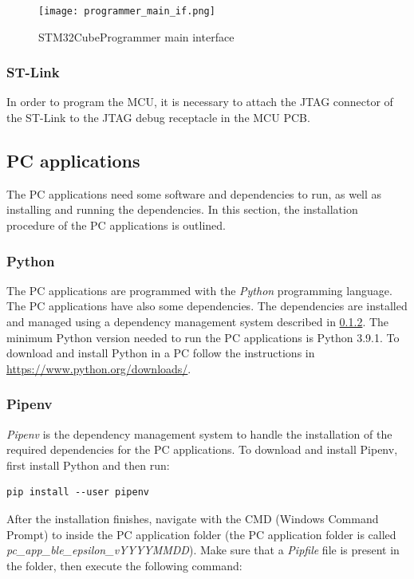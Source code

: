 \begin{figure}[ht]
	\centering
	\texttt{[image: programmer\_main\_if.png]}
	\caption{STM32CubeProgrammer main interface \label{fig:prog_main}}
\end{figure}

\subsubsection{ST-Link}

In order to program the MCU, it is necessary to attach the JTAG connector of the ST-Link to the JTAG debug receptacle in the MCU PCB.

\subsection{PC applications} \label{secdoc:pc_install}

The PC applications need some software and dependencies to run, as well as installing and running the dependencies. In this section, the installation procedure of the PC applications is outlined.

\subsubsection{Python}

The PC applications are programmed with the \textit{Python} programming language. The PC applications have also some dependencies. The dependencies are installed and managed using a dependency management system described in \cref{secdoc:pipenv}. The minimum Python version needed to run the PC applications is Python 3.9.1. To download and install Python in a PC follow the instructions in \url{https://www.python.org/downloads/}.

\subsubsection{Pipenv} \label{secdoc:pipenv}

\textit{Pipenv} is the dependency management system to handle the installation of the required dependencies for the PC applications. To download and install Pipenv, first install Python and then run:

\begin{verbatim}
pip install --user pipenv
\end{verbatim}

After the installation finishes, navigate with the CMD (Windows Command Prompt) to inside the PC application folder (the PC application folder is called \textit{pc\_app\_ble\_epsilon\_vYYYYMMDD}). Make sure that a \textit{Pipfile} file is present in the folder, then execute the following command:

